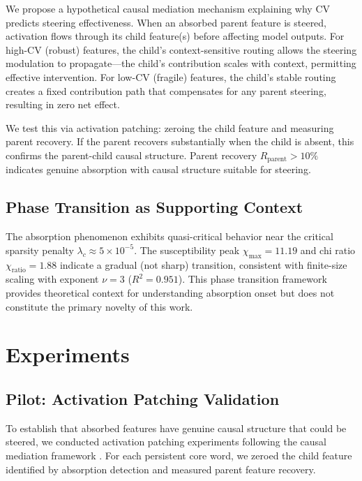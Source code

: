 \documentclass{article}
\begin{document}
We propose a hypothetical causal mediation mechanism explaining why CV predicts steering effectiveness. When an absorbed parent feature is steered, activation flows through its child feature(s) before affecting model outputs. For high-CV (robust) features, the child's context-sensitive routing allows the steering modulation to propagate---the child's contribution scales with context, permitting effective intervention. For low-CV (fragile) features, the child's stable routing creates a fixed contribution path that compensates for any parent steering, resulting in zero net effect.

We test this via activation patching: zeroing the child feature and measuring parent recovery. If the parent recovers substantially when the child is absent, this confirms the parent-child causal structure. Parent recovery $R_{\text{parent}} > 10\%$ indicates genuine absorption with causal structure suitable for steering.

\subsection{Phase Transition as Supporting Context}

The absorption phenomenon exhibits quasi-critical behavior near the critical sparsity penalty $\lambda_c \approx 5 \times 10^{-5}$. The susceptibility peak $\chi_{\max} = 11.19$ and chi ratio $\chi_{\text{ratio}} = 1.88$ indicate a gradual (not sharp) transition, consistent with finite-size scaling with exponent $\nu = 3$ ($R^2 = 0.951$). This phase transition framework provides theoretical context for understanding absorption onset but does not constitute the primary novelty of this work.

\section{Experiments}

\subsection{Pilot: Activation Patching Validation}

To establish that absorbed features have genuine causal structure that could be steered, we conducted activation patching experiments following the causal mediation framework \citep{pearl2009causality}. For each persistent core word, we zeroed the child feature identified by absorption detection and measured parent feature recovery.
\end{document}
